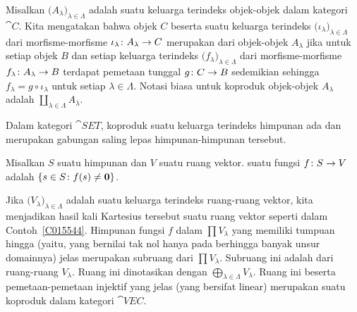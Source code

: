 \begin{defn}\label{C015624} Misalkan $\bigl(A_\lambda\bigr)_{\lambda \in \Lambda}$ adalah suatu keluarga terindeks
objek-objek dalam kategori~$\cat C$. Kita mengatakan bahwa objek $C$ beserta suatu
keluarga terindeks $\bigl(\iota_\lambda\bigr)_{\lambda \in \Lambda}$ dari morfisme-morfisme
$\iota_\lambda\colon A_\lambda \rightarrow C$ merupakan
 dari objek-objek $A_\lambda$ jika untuk setiap objek $B$ dan setiap keluarga
terindeks $\bigl(f_\lambda\bigr)_{\lambda \in \Lambda}$ dari morfisme-morfisme $f_\lambda\colon
A_\lambda \rightarrow B$ terdapat pemetaan tunggal $g \colon C \rightarrow B$ sedemikian sehingga $f_\lambda = g
\circ \iota_\lambda$ untuk setiap $\lambda \in \Lambda$. Notasi biasa untuk
koproduk objek-objek $A_\lambda$ adalah
$\coprod_{\lambda \in \Lambda} A_\lambda$.
\end{defn}

\begin{exam} Dalam kategori $\cat{SET}$,
koproduk suatu keluarga terindeks himpunan ada dan merupakan gabungan saling lepas himpunan-himpunan tersebut.
\end{exam}

\begin{defn} Misalkan $S$ suatu himpunan dan $V$ suatu ruang vektor.
 suatu fungsi $f \colon S \rightarrow V$ adalah $\{s \in S \colon f(s) \ne \mathbf{0}\}$.
\end{defn}

\begin{exam}\label{X_dir_sum_VEC} Jika $\bigl(V_\lambda\bigr)_{\lambda \in \Lambda}$ adalah suatu keluarga terindeks
ruang-ruang vektor, kita menjadikan hasil kali Kartesius tersebut suatu ruang vektor seperti dalam Contoh~\ref{C015544}. Himpunan fungsi $f$
dalam $\prod V_\lambda$ yang memiliki tumpuan hingga (yaitu, yang bernilai tak nol hanya pada berhingga banyak unsur domainnya) jelas
merupakan subruang dari $\prod V_\lambda$. Subruang ini adalah
 dari ruang-ruang $V_\lambda$. Ruang ini dinotasikan dengan $\bigoplus_{\lambda \in
\Lambda} V_\lambda$. Ruang ini beserta pemetaan-pemetaan injektif yang jelas (yang
bersifat linear) merupakan suatu
koproduk dalam kategori $\cat{VEC}$.
\end{exam}

